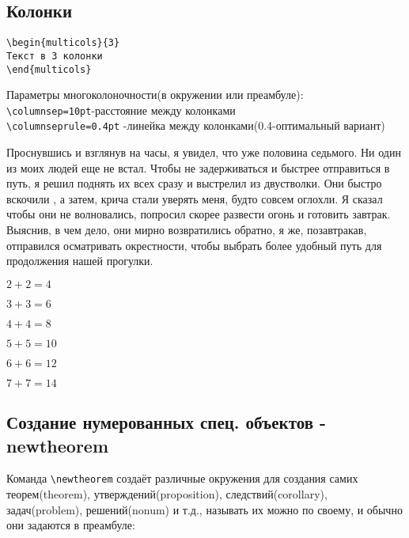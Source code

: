 \documentclass[a4paper,12pt]{article}%
\theoremstyle{plain}%
\theoremstyle{definition}%
\theoremstyle{remark}%
\begin{document}
\subsection{Колонки}

\begin{verbatim}
\begin{multicols}{3}
Текст в 3 колонки
\end{multicols}
\end{verbatim}

\noindent Параметры многоколоночности(в окружении или преамбуле): \\
\verb|\columnsep=10pt|-расстояние между колонками \\
\verb|\columnseprule=0.4pt| -линейка между колонками(0.4-оптимальный вариант)

\begin{multicols}{2}
\columnsep=20pt
\columnseprule=0.5pt
Проснувшись и взглянув на часы, я увидел, что уже половина седьмого. Ни один из моих людей еще не встал. Чтобы не задерживаться и быстрее отправиться в путь, я решил поднять их всех сразу и выстрелил из двустволки. Они быстро вскочили , а затем, крича стали уверять меня, будто совсем оглохли. Я сказал чтобы они не волновались, попросил скорее развести огонь и готовить завтрак. Выяснив, в чем дело, они мирно возвратились обратно, я же, позавтракав, отправился осматривать окрестности, чтобы выбрать более удобный путь для продолжения нашей прогулки.
\end{multicols}

\begin{enumerate}
\begin{multicols}{3}
\item $2+2=4$
\item $3+3=6$
\item $4+4=8$
\item $5+5=10$
\item $6+6=12$
\item $7+7=14$
\end{multicols}
\end{enumerate}



\subsection{Создание нумерованных спец. объектов - newtheorem}

Команда \verb|\newtheorem| создаёт различные окружения для создания самих теорем(theorem), утверждений(proposition), следствий(corollary), задач(problem), решений(nonum) и т.д., называть их можно по своему, и обычно они задаются в преамбуле: \\
\end{document}
